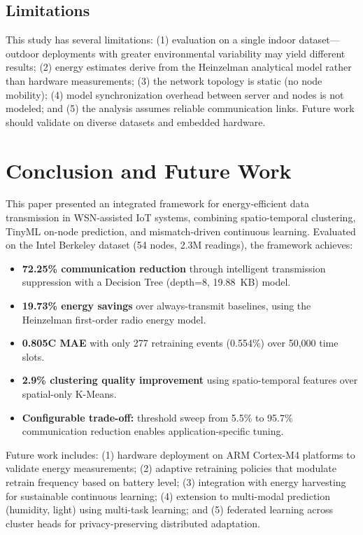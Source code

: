 \documentclass[conference]{IEEEtran}
\begin{document}
\subsection{Limitations}

This study has several limitations: (1) evaluation on a single indoor dataset---outdoor deployments with greater environmental variability may yield different results; (2) energy estimates derive from the Heinzelman analytical model rather than hardware measurements; (3) the network topology is static (no node mobility); (4) model synchronization overhead between server and nodes is not modeled; and (5) the analysis assumes reliable communication links. Future work should validate on diverse datasets and embedded hardware.

\section{Conclusion and Future Work}
\label{sec:conclusion}

This paper presented an integrated framework for energy-efficient data transmission in WSN-assisted IoT systems, combining spatio-temporal clustering, TinyML on-node prediction, and mismatch-driven continuous learning. Evaluated on the Intel Berkeley dataset (54 nodes, 2.3M readings), the framework achieves:

\begin{itemize}
    \item \textbf{72.25\% communication reduction} through intelligent transmission suppression with a Decision Tree (depth=8, 19.88~KB) model.
    \item \textbf{19.73\% energy savings} over always-transmit baselines, using the Heinzelman first-order radio energy model.
    \item \textbf{0.805\textdegree C MAE} with only 277 retraining events (0.554\%) over 50,000 time slots.
    \item \textbf{2.9\% clustering quality improvement} using spatio-temporal features over spatial-only K-Means.
    \item \textbf{Configurable trade-off:} threshold sweep from 5.5\% to 95.7\% communication reduction enables application-specific tuning.
\end{itemize}

Future work includes: (1) hardware deployment on ARM Cortex-M4 platforms to validate energy measurements; (2) adaptive retraining policies that modulate retrain frequency based on battery level; (3) integration with energy harvesting for sustainable continuous learning; (4) extension to multi-modal prediction (humidity, light) using multi-task learning; and (5) federated learning across cluster heads for privacy-preserving distributed adaptation.
\end{document}
